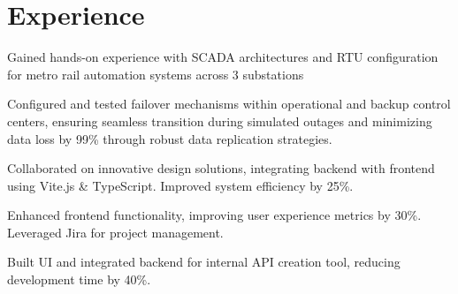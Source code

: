 \documentclass[]{deedy-resume-reversed}
\begin{document}
%
%

%
%



%
%
\vspace{0.6em}
\begin{minipage}[t]{0.60\textwidth}


\section{Experience}
\vspace{\topsep} %
\begin{tightemize}
\item Gained hands-on experience with SCADA architectures and RTU configuration for metro rail automation systems across 3 substations
\item Configured and tested failover mechanisms within operational and backup control centers, ensuring seamless transition during simulated outages and minimizing data loss by 99\% through robust data replication strategies.
\end{tightemize}
\sectionsep

\begin{tightemize}
\item Collaborated on innovative design solutions, integrating backend with frontend using Vite.js \& TypeScript. Improved system efficiency by 25\%.
\item Enhanced frontend functionality, improving user experience metrics by 30\%. Leveraged Jira for project management.
\item Built UI and integrated backend for internal API creation tool, reducing development time by 40\%.
\end{tightemize}
\sectionsep


\end{minipage}
\end{document}
